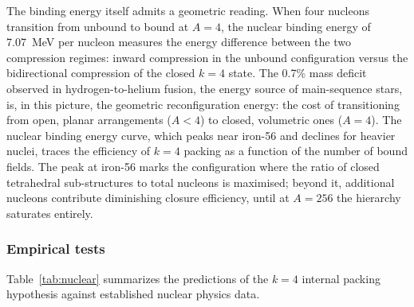 \documentclass[aps,prd,preprint,superscriptaddress,showpacs,preprintnumbers,amsmath,amssymb,nofootinbib]{revtex4-2}
\begin{document}
The binding energy itself admits a geometric reading. When four nucleons transition from unbound to bound at $A = 4$, the nuclear binding energy of 7.07~MeV per nucleon measures the energy difference between the two compression regimes: inward compression in the unbound configuration versus the bidirectional compression of the closed $k = 4$ state. The 0.7\% mass deficit observed in hydrogen-to-helium fusion, the energy source of main-sequence stars, is, in this picture, the geometric reconfiguration energy: the cost of transitioning from open, planar arrangements ($A < 4$) to closed, volumetric ones ($A = 4$). The nuclear binding energy curve, which peaks near iron-56 and declines for heavier nuclei, traces the efficiency of $k = 4$ packing as a function of the number of bound fields. The peak at iron-56 marks the configuration where the ratio of closed tetrahedral sub-structures to total nucleons is maximised; beyond it, additional nucleons contribute diminishing closure efficiency, until at $A = 256$ the hierarchy saturates entirely.

\subsubsection*{Empirical tests}

Table~\ref{tab:nuclear} summarizes the predictions of the $k = 4$ internal packing hypothesis against established nuclear physics data.
\end{document}
